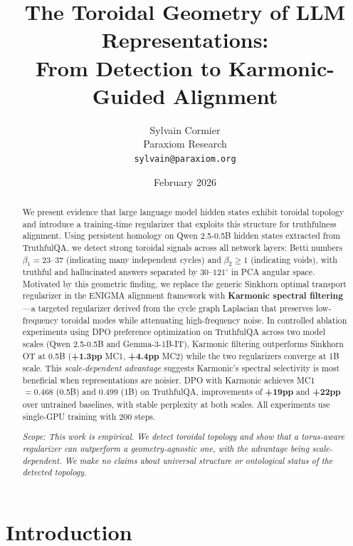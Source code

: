 \documentclass[11pt,a4paper]{article}
\title{The Toroidal Geometry of LLM Representations:\\From Detection to Karmonic-Guided Alignment}
\author{Sylvain Cormier\\
Paraxiom Research\\
\texttt{sylvain@paraxiom.org}}
\date{February 2026}
\begin{document}
\maketitle

\begin{abstract}
We present evidence that large language model hidden states exhibit toroidal topology and introduce a training-time regularizer that exploits this structure for truthfulness alignment. Using persistent homology on Qwen 2.5-0.5B hidden states extracted from TruthfulQA, we detect strong toroidal signals across all network layers: Betti numbers $\beta_1 = 23$--$37$ (indicating many independent cycles) and $\beta_2 \geq 1$ (indicating voids), with truthful and hallucinated answers separated by $30$--$121^\circ$ in PCA angular space. Motivated by this geometric finding, we replace the generic Sinkhorn optimal transport regularizer in the ENIGMA alignment framework with \textbf{Karmonic spectral filtering}---a targeted regularizer derived from the cycle graph Laplacian that preserves low-frequency toroidal modes while attenuating high-frequency noise. In controlled ablation experiments using DPO preference optimization on TruthfulQA across two model scales (Qwen 2.5-0.5B and Gemma-3-1B-IT), Karmonic filtering outperforms Sinkhorn OT at 0.5B (\textbf{+1.3pp} MC1, \textbf{+4.4pp} MC2) while the two regularizers converge at 1B scale. This \emph{scale-dependent advantage} suggests Karmonic's spectral selectivity is most beneficial when representations are noisier. DPO with Karmonic achieves MC1 $= 0.468$ (0.5B) and $0.499$ (1B) on TruthfulQA, improvements of \textbf{+19pp} and \textbf{+22pp} over untrained baselines, with stable perplexity at both scales. All experiments use single-GPU training with 200 steps.

\medskip
\noindent\textit{Scope: This work is empirical. We detect toroidal topology and show that a torus-aware regularizer can outperform a geometry-agnostic one, with the advantage being scale-dependent. We make no claims about universal structure or ontological status of the detected topology.}
\end{abstract}

\section{Introduction}
\end{document}
